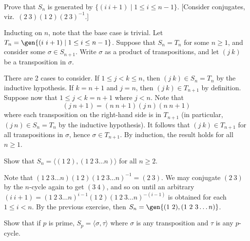 \begin{exercise}\label{ex3.5.3}
    Prove that $S_n$ is generated by $\{(i\ i+1)\mid 1 \le i \le n-1\}$. [Consider conjugates, viz.\ $(2\ 3)(1\ 2)(2\ 3)^{-1}$.]
\end{exercise}

\begin{sol}
    Inducting on $n$, note that the base case is trivial. Let $T_n = \gen{(i\ i + 1) \mid 1 \leq i \leq n - 1}$. Suppose that $S_n = T_n$ for some $n \geq 1$, and consider some $\sigma \in S_{n + 1}$. Write $\sigma$ as a product of transpositions, and let $(j\ k)$ be a transposition in $\sigma$.

    There are 2 cases to consider. If $1 \leq j < k \leq n$, then $(j\ k) \in S_n = T_n$ by the inductive hypothesis. If $k = n + 1$ and $j = n$, then $(j\ k) \in T_{n + 1}$ by definition. Suppose now that $1 \leq j < k = n + 1$ where $j < n$. Note that
    \[(j\ n + 1) = (n\ n + 1)(j\ n)(n\ n + 1)\]
    where each transposition on the right-hand side is in $T_{n + 1}$ (in particular, $(j\ n) \in S_n = T_n$ by the inductive hypothesis). It follows that $(j\ k) \in T_{n + 1}$ for all transpositions in $\sigma$, hence $\sigma \in T_{n + 1}$. By induction, the result holds for all $n \geq 1$.
\end{sol}

\begin{exercise}\label{ex3.5.4}
    Show that $S_n=\langle (1\ 2),(1\ 2\ 3 \ldots n)\rangle$ for all $n\ge2$.
\end{exercise}

\begin{sol}
    Note that $(1\ 2\ 3 \ldots n)(1\ 2)(1\ 2\ 3 \ldots n)^{-1} = (2\ 3)$. We may conjugate $(2\ 3)$ by the $n$-cycle again to get $(3\ 4)$, and so on until an arbitrary $(i\ i + 1) = (1\ 2\ 3 \ldots n)^{i - 1}(1\ 2)(1\ 2\ 3 \ldots n)^{-(i - 1)}$ is obtained for each $1 \leq i < n$. By the previous exercise, then $S_n = \gen{(1\ 2), (1\ 2\ 3 \ldots n)}$.
\end{sol}

\begin{exercise}\label{ex3.5.5}
    Show that if $p$ is prime, $S_p=\langle \sigma,\tau\rangle$ where $\sigma$ is any transposition and $\tau$ is any $p$-cycle.
\end{exercise}

